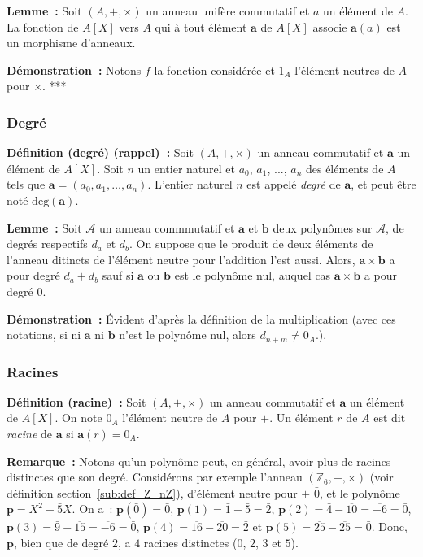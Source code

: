 \medskip

\noindent\textbf{Lemme :} Soit $(A, +, \times)$ un anneau unifère commutatif et $a$ un élément de $A$.
    La fonction de $A[X]$ vers $A$ qui à tout élément $\mathbf{a}$ de $A[X]$ associe $\mathbf{a}(a)$ est un morphisme d'anneaux.

\medskip

\noindent\textbf{Démonstration :} 
    Notons $f$ la fonction considérée et $1_A$ l'élément neutres de $A$ pour $\times$.  
    ***

\subsubsection{Degré}

\noindent\textbf{Définition (degré) (rappel) :} Soit $(A, +, \times)$ un anneau commutatif et $\mathbf{a}$ un élément de $A[X]$.
    Soit $n$ un entier naturel et $a_0$, $a_1$, ..., $a_n$ des éléments de $A$ tels que $\mathbf{a} = (a_0, a_1, \dots, a_n)$.
    L'entier naturel $n$ est appelé \textit{degré} de $\mathbf{a}$, et peut être noté $\mathrm{deg}(\mathbf{a})$. 
\medskip

\noindent\textbf{Lemme :} Soit $\mathcal{A}$ un anneau commmutatif et $\mathbf{a}$ et $\mathbf{b}$ deux polynômes sur $\mathcal{A}$, de degrés respectifs $d_a$ et $d_b$. 
    On suppose que le produit de deux éléments de l'anneau ditincts de l'élément neutre pour l'addition l'est aussi.
    Alors, $\mathbf{a} \times \mathbf{b}$ a pour degré $d_a + d_b$ sauf si $\mathbf{a}$ ou $\mathbf{b}$ est le polynôme nul, auquel cas $\mathbf{a} \times \mathbf{b}$ a pour degré $0$.

\medskip

\noindent\textbf{Démonstration :} Évident d'après la définition de la multiplication (avec ces notations, si ni $\mathbf{a}$ ni $\mathbf{b}$ n'est le polynôme nul, alors $d_{n+m} \neq 0_A$.).

\subsubsection{Racines}

\noindent\textbf{Définition (racine) :} Soit $(A, +, \times)$ un anneau commutatif et $\mathbf{a}$ un élément de $A[X]$.
    On note $0_A$ l'élément neutre de $A$ pour $+$.
    Un élément $r$ de $A$ est dit \textit{racine} de $\mathbf{a}$ si $\mathbf{a}(r) = 0_A$.

\medskip

\noindent\textbf{Remarque :} Notons qu'un polynôme peut, en général, avoir plus de racines distinctes que son degré. 
    Considérons par exemple l'anneau $(\mathbb{Z}_6, +, \times)$ (voir définition section~\ref{sub:def_Z_nZ}), d'élément neutre pour $+$ $\bar{0}$, et le polynôme $\mathbf{p} = X^2 - \bar{5} X$. 
    On a : $\mathbf{p}(\bar{0}) = \bar{0}$, $\mathbf{p}(1) = \bar{1} - \bar{5} = \bar{2}$, $\mathbf{p}(2) = \bar{4} - \overline{10} = \overline{-6} = \bar{0}$, $\mathbf{p}(3) = \bar{9} - \overline{15} = \overline{-6} = \bar{0}$, $\mathbf{p}(4) = \overline{16} - \overline{20} = \bar{2}$ et $\mathbf{p}(5) = \overline{25} - \overline{25} = \bar{0}$. 
    Donc, $\mathbf{p}$, bien que de degré $2$, a $4$ racines distinctes ($\bar{0}$, $\bar{2}$, $\bar{3}$ et $\bar{5}$).

